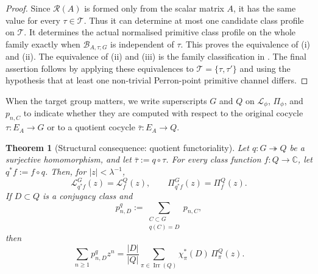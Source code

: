 \documentclass[11pt,a4paper]{amsart}
\theoremstyle{plain}
\newtheorem{theorem}{Theorem}[section]
\theoremstyle{definition}
\theoremstyle{remark}
\DeclareMathOperator{\Irr}{Irr}
\newcommand{\CC}{\mathbb{C}}
\begin{document}
\begin{proof}
  Since \(\mathcal R(A)\) is formed only from the scalar matrix \(A\), it
  has the same value for every \(\tau\in\mathscr T\). Thus it can
  determine at most one candidate class profile on \(\mathscr T\). It
  determines the actual normalised primitive class profile on the whole
  family exactly when
  \(\mathcal B_{A,\tau;G}\) is independent of \(\tau\). This proves the
  equivalence of \textup{(i)} and \textup{(ii)}. The equivalence of
  \textup{(ii)} and \textup{(iii)} is the family classification in
  . The final
  assertion follows by applying these equivalences to
  \(\mathscr T=\{\tau,\tau'\}\) and using the hypothesis that at least one
  non-trivial Perron-point primitive channel differs.
\end{proof}

When the target group matters, we write superscripts \(G\) and \(Q\) on
\(\mathcal L_\phi\), \(\Pi_\phi\), and \(p_{n,C}\) to indicate whether
they are computed with respect to the original cocycle \(\tau:E_A\to G\)
or to a quotient cocycle \(\bar\tau:E_A\to Q\).

\begin{theorem}[Structural consequence: quotient functoriality]
  \label{thm:quotient-functoriality}
  Let \(q:G\twoheadrightarrow Q\) be a surjective homomorphism, and let
  \(\bar\tau:=q\circ\tau\). For every class function \(f:Q\to\CC\), let
  \(q^\ast f:=f\circ q\). Then, for \(|z|<\lambda^{-1}\),
  \begin{equation}\label{eq:quotient-functoriality-log}
    \mathcal L_{q^\ast f}^{G}(z)=\mathcal L_f^{Q}(z),
    \qquad
    \Pi_{q^\ast f}^{G}(z)=\Pi_f^{Q}(z).
  \end{equation}
  If \(D\subset Q\) is a conjugacy class and
  \[
    p^q_{n,D}:=\sum_{\substack{C\subset G\\ q(C)=D}}p_{n,C},
  \]
  then
  \begin{equation}\label{eq:quotient-primitive-class-decomposition}
    \sum_{n\ge 1}p^q_{n,D}z^n
    =
    \frac{|D|}{|Q|}
      \sum_{\pi\in\Irr(Q)}
        \chi_\pi^\ast(D)\,\Pi_\pi^{Q}(z).
  \end{equation}
\end{theorem}
\end{document}
